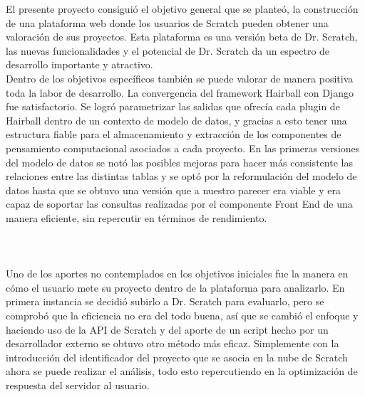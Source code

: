 \documentclass[a4paper, 12pt]{book}
\begin{document}
El presente proyecto consiguió el objetivo general que se planteó, la 
construcción de una plataforma web donde los usuarios de Scratch pueden 
obtener una valoración de sus proyectos. Esta plataforma es una versión
beta de Dr. Scratch, las nuevas funcionalidades y el potencial de Dr. 
Scratch da un espectro de desarrollo importante y atractivo. \\

Dentro de los objetivos específicos también se puede valorar de manera
positiva toda la labor de desarrollo. La convergencia del framework
Hairball con Django fue satisfactorio. Se logró parametrizar las salidas
que ofrecía cada plugin de Hairball dentro de un contexto de modelo de
datos, y gracias a esto tener una estructura fiable para el almacenamiento
y extracción de los componentes de pensamiento computacional asociados
a cada proyecto. En las primeras versiones del modelo de datos se notó
las posibles mejoras para hacer más consistente las relaciones entre las
distintas tablas y se optó por la reformulación del modelo de datos hasta
que se obtuvo una versión que a nuestro parecer era viable y era capaz
de soportar las consultas realizadas por el componente Front End de una
manera eficiente, sin repercutir en términos de rendimiento. \\ \\ \\ \\

Uno de los aportes no contemplados en los objetivos iniciales fue la
manera en cómo el usuario mete su proyecto dentro de la plataforma
para analizarlo. En primera instancia se decidió subirlo a Dr. Scratch
para evaluarlo, pero se comprobó que la eficiencia no era del todo
buena, así que se cambió el enfoque y haciendo uso de la API de Scratch
y del aporte de un script hecho por un desarrollador externo se 
obtuvo otro método más eficaz. Simplemente con la introducción del 
identificador del proyecto que se asocia en la nube de Scratch ahora
se puede realizar el análisis, todo esto repercutiendo en la optimización 
de respuesta del servidor al usuario. \\
\end{document}
